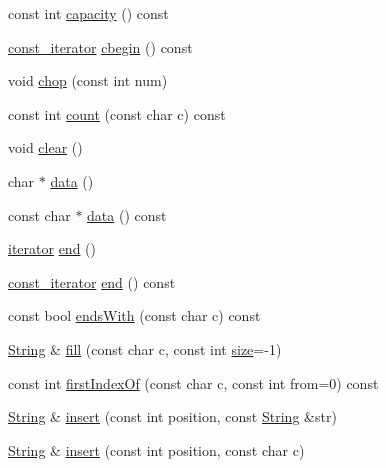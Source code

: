 \begin{DoxyCompactItemize}
\item 
const int \hyperlink{classprism_1_1_string_a79a0e1b2a185376d36935ff637ba5678}{capacity} () const 
\item 
\hyperlink{classprism_1_1_string_a8b46f0fbe9c5c94ba892975242e3ab68}{const\+\_\+iterator} \hyperlink{classprism_1_1_string_a75949922d27570e2e10bb9b48c12040b}{cbegin} () const 
\item 
void \hyperlink{classprism_1_1_string_a6a0006f4412961eab5625d6366f60137}{chop} (const int num)
\item 
const int \hyperlink{classprism_1_1_string_adde5ee34a762ec89df4354f562cb4c39}{count} (const char c) const 
\item 
void \hyperlink{classprism_1_1_string_adcfa3f36badcb9e84c2c956a6b29c865}{clear} ()
\item 
char $\ast$ \hyperlink{classprism_1_1_string_aa70973a523fcfbaa608645085f004d29}{data} ()
\item 
const char $\ast$ \hyperlink{classprism_1_1_string_a8f28ba12d030e7f28fe533901dad97ea}{data} () const 
\item 
\hyperlink{classprism_1_1_string_adacc7975837e5fff95d70690777fb330}{iterator} \hyperlink{classprism_1_1_string_a66cac7d74458715877d381c036bd1698}{end} ()
\item 
\hyperlink{classprism_1_1_string_a8b46f0fbe9c5c94ba892975242e3ab68}{const\+\_\+iterator} \hyperlink{classprism_1_1_string_ada5833ed658db9ed7cd0d847b727b1c3}{end} () const 
\item 
const bool \hyperlink{classprism_1_1_string_aa478bddcdb9ea30ba0a8d1389296607c}{ends\+With} (const char c) const 
\item 
\hyperlink{classprism_1_1_string}{String} \& \hyperlink{classprism_1_1_string_ae7d89942e4c7ab431331400eb5489854}{fill} (const char c, const int \hyperlink{classprism_1_1_string_a603b5a90681d43adf7c6c29018e0300c}{size}=-\/1)
\item 
const int \hyperlink{classprism_1_1_string_af3b71f73c184a5f14ef91ad6e56187b7}{first\+Index\+Of} (const char c, const int from=0) const 
\item 
\hyperlink{classprism_1_1_string}{String} \& \hyperlink{classprism_1_1_string_aebf2f6e19cb77967798ba096bb559f81}{insert} (const int position, const \hyperlink{classprism_1_1_string}{String} \&str)
\item 
\hyperlink{classprism_1_1_string}{String} \& \hyperlink{classprism_1_1_string_a370a65ea4c44d5f2e3d85f441f708c3f}{insert} (const int position, const char c)
\item 

\end{DoxyCompactItemize}
